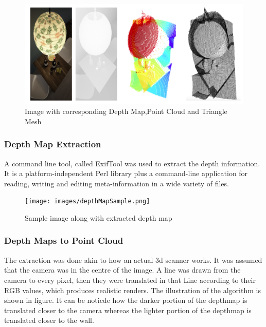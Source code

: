 \documentclass{article}
\begin{document}
    \begin{figure}[H]
        \centering
        \includegraphics[width=15cm]{images/imageDMPC.png}
        \caption{Image with corresponding Depth Map,Point Cloud and Triangle Mesh}
        
    \end{figure}

    
    \subsubsection{Depth Map Extraction}
    
    A command line tool, called ExifTool was used to extract the depth information. It is a platform-independent Perl library plus a command-line application for reading, writing and editing meta-information in a wide variety of files. 
    \begin{figure}[H]
        \centering
        \texttt{[image: images/depthMapSample.png]}
        \caption{Sample image along with extracted depth map}
    
    \end{figure}
    
    
    \subsubsection{Depth Maps to Point Cloud}
    
  
  The extraction was done akin to how an actual 3d scanner works. It was assumed that the camera was in the centre of the image. A line was drawn from the camera to every pixel, then they were translated in that Line according to  their RGB values, which produces realistic renders. The illustration of the algorithm is shown in figure. It can be noticde how the darker portion of the depthmap is translated closer to the camera whereas the lighter portion of the depthmap is translated closer to the wall.
  
\end{document}
